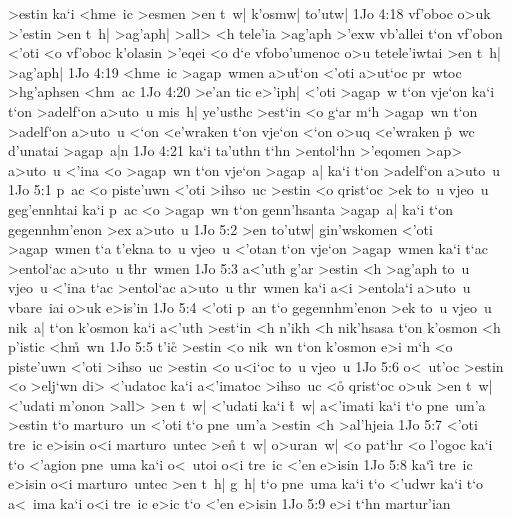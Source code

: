 >estin
ka`i
<hme~ic
>esmen
>en
t~w|
k'osmw|
to'utw|\bibvsend
\vs 1Jo 4:18
vf'oboc
o>uk
>'estin
>en
t~h|
>ag'aph|
>all>
<h
tele'ia
>ag'aph
>'exw
vb'allei
t`on
vf'obon
<'oti
<o
vf'oboc
k'olasin
>'eqei
<o
d`e
vfobo'umenoc
o>u
tetele'iwtai
>en
t~h|
>ag'aph|\bibvsend
\vs 1Jo 4:19
<hme~ic
>agap~wmen
a>u\r{t}`on
<'oti
a>ut`oc
pr~wtoc
>hg'aphsen
<hm~ac\bibvsend
\vs 1Jo 4:20
>e'an
tic
e>'iph|
<'oti
>agap~w
t`on
vje`on
ka`i
t`on
>adelf`on
a>uto~u
mis~h|
ye'usthc
>est`in
<o
g`ar
m`h
>agap~wn
t`on
>adelf`on
a>uto~u
<`on
<e'wraken
t`on
vje`on
<`on
o>uq
<e'wraken
\r{p}~wc
d'unatai
>agap~a|n\bibvsend
\vs 1Jo 4:21
ka`i
ta'uthn
t`hn
>entol`hn
>'eqomen
>ap>
a>uto~u
<'ina
<o
>agap~wn
t`on
vje`on
>agap~a|
ka`i
t`on
>adelf`on
a>uto~u\bibvsend
\vs 1Jo 5:1
p~ac
<o
piste'uwn
<'oti
>ihso~uc
>estin
<o
qrist`oc
>ek
to~u
vjeo~u
geg'ennhtai
ka`i
p~ac
<o
>agap~wn
t`on
genn'hsanta
>agap~a|
ka`i
t`on
gegennhm'enon
>ex
a>uto~u\bibvsend
\vs 1Jo 5:2
>en
to'utw|
gin'wskomen
<'oti
>agap~wmen
t`a
t'ekna
to~u
vjeo~u
<'otan
t`on
vje`on
>agap~wmen
ka`i
t`ac
>entol`ac
a>uto~u
\r{t}hr~wmen\bibvsend
{}
\vs 1Jo 5:3
a<'uth
g'ar
>estin
<h
>ag'aph
to~u
vjeo~u
<'ina
t`ac
>entol`ac
a>uto~u
thr~wmen
ka`i
a<i
>entola`i
a>uto~u
vbare~iai
o>uk
e>is'in\bibvsend
\vs 1Jo 5:4
<'oti
p~an
t`o
gegennhm'enon
>ek
to~u
vjeo~u
nik~a|
t`on
k'osmon
ka`i
a<'uth
>est`in
<h
n'ikh
<h
nik'hsasa
t`on
k'osmon
<h
p'istic
<h\r{m}~wn\bibvsend
{}
\vs 1Jo 5:5
t'i\r{c}
>estin
<o
nik~wn
t`on
k'osmon
e>i
m`h
<o
piste'uwn
<'oti
>ihso~uc
>estin
<o
u<i`oc
to~u
vjeo~u\bibvsend
\vs 1Jo 5:6
o<~ut'oc
>estin
<o
>elj`wn
di>
<'udatoc
ka`i
a<'imatoc
>ihso~uc
<o\r{}
qrist`oc
o>uk
>en
t~w|
<'udati
m'onon
>all>
>en
t~w|
<'udati
ka`i
\r{t}~w|
a<'imati
ka`i
t`o
pne~um'a
>estin
t`o
marturo~un
<'oti
t`o
pne~um'a
>estin
<h
>al'hjeia\bibvsend
\vs 1Jo 5:7
<'oti
tre~ic
e>isin
o<i
marturo~untec
>en\r{}
t~w|
o>uran~w|
<o
pat`hr
<o
l'ogoc
ka`i
t`o
<'agion
pne~uma
ka`i
o<~utoi
o<i
tre~ic
<'en
e>isin\bibvsend
\vs 1Jo 5:8
ka`i\r{}
tre~ic
e>isin
o<i
marturo~untec
>en
t~h|
g~h|
t`o
pne~uma
ka`i
t`o
<'udwr
ka`i
t`o
a<~ima
ka`i
o<i
tre~ic
e>ic
t`o
<'en
e>isin\bibvsend
\vs 1Jo 5:9
e>i
t`hn
martur'ian
